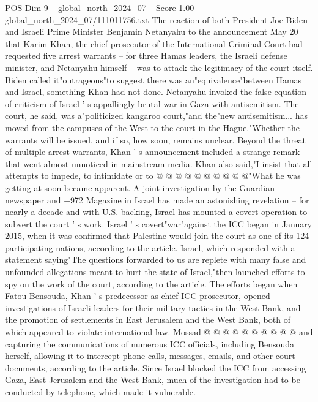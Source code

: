 \begin{textsample}{POS Dim 9 – global\_north\_2024\_07 – Score 1.00 – global\_north\_2024\_07/111011756.txt}  \label{ex:f9_pos_290}
The reaction of both President Joe Biden and Israeli Prime Minister Benjamin Netanyahu to the announcement May 20 that Karim Khan, the chief prosecutor of the International Criminal Court had requested five arrest warrants -- for three Hamas leaders, the Israeli defense minister, and Netanyahu himself -- was to attack the legitimacy of the court itself.
Biden called it"outrageous"to suggest there was an"equivalence"between Hamas and Israel, something Khan had not done.
Netanyahu invoked the false equation of criticism of Israel ' s appallingly brutal war in Gaza with antisemitism.
The court, he said, was a"politicized kangaroo court,"and the"new antisemitism... has moved from the campuses of the West to the court in the Hague."Whether the warrants will be issued, and if so, how soon, remains unclear.
Beyond the threat of multiple arrest warrants, Khan ' s announcement included a strange remark that went almost unnoticed in mainstream media.
Khan also said,"I insist that all attempts to impede, to intimidate or to @ @ @ @ @ @ @ @ @ @"What he was getting at soon became apparent.
A joint investigation by the Guardian newspaper and +972 Magazine in Israel has made an astonishing revelation -- for nearly a decade and with U.S. backing, Israel has mounted a covert operation to subvert the court ' s work.
Israel ' s covert"war"against the ICC began in January 2015, when it was confirmed that Palestine would join the court as one of its 124 participating nations, according to the article.
Israel, which responded with a statement saying"The questions forwarded to us are replete with many false and unfounded allegations meant to hurt the state of Israel,"then launched efforts to spy on the work of the court, according to the article.
The efforts began when Fatou Bensouda, Khan ' s predecessor as chief ICC prosecutor, opened investigations of Israeli leaders for their military tactics in the West Bank, and the promotion of settlements in East Jerusalem and the West Bank, both of which appeared to violate international law.
Mossad @ @ @ @ @ @ @ @ @ @ and capturing the communications of numerous ICC officials, including Bensouda herself, allowing it to intercept phone calls, messages, emails, and other court documents, according to the article.
Since Israel blocked the ICC from accessing Gaza, East Jerusalem and the West Bank, much of the investigation had to be conducted by telephone, which made it vulnerable.

\end{textsample}
